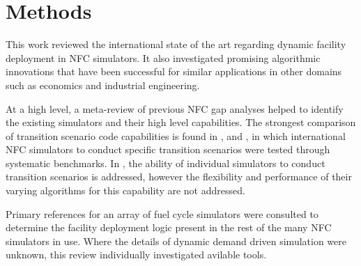 \section{Methods}

This work reviewed the international state of the art regarding dynamic 
facility deployment in \gls{NFC} simulators. It also investigated promising 
algorithmic innovations that have been successful for similar applications in 
other domains such as economics and industrial engineering.

At a high level, a meta-review of previous \gls{NFC} gap analyses 
helped to identify the existing simulators and their high 
level capabilities. The strongest comparison of transition scenario code 
capabilities is found in \cite{boucher_international_2010}, 
\cite{brown_identification_2016} and \cite{mccarthy_benchmark_2012}, in which 
international \gls{NFC} simulators to conduct specific transition scenarios 
were tested through systematic benchmarks. In 
\cite{carre_overview_2016,hoffman_expanded_2016}, the ability of individual 
simulators to conduct transition scenarios is addressed, however the 
flexibility and performance of their varying algorithms for this capability are 
not addressed.

Primary references for an array of fuel cycle simulators were consulted to 
determine the facility deployment logic present in the rest of the many 
\gls{NFC} simulators in use. Where the details of dynamic demand driven 
simulation were unknown, this review individually investigated avilable tools. 
